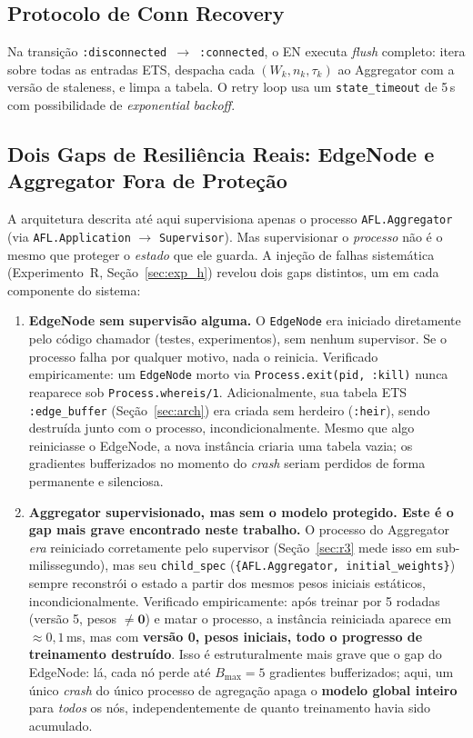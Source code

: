 \documentclass[conference,a4paper]{IEEEtran}
\begin{document}
\subsection{Protocolo de Conn Recovery}

Na transição \texttt{:disconnected}~$\rightarrow$~\texttt{:connected}, o EN
executa \textit{flush} completo: itera sobre todas as entradas ETS,
despacha cada $(W_k, n_k, \tau_k)$ ao Aggregator com a versão de staleness,
e limpa a tabela. O retry loop usa um \texttt{state\_timeout} de 5\,s com
possibilidade de \textit{exponential backoff}.

\subsection{Dois Gaps de Resiliência Reais: EdgeNode e Aggregator Fora de Proteção}
\label{sec:gap}

A arquitetura descrita até aqui supervisiona apenas o processo
\texttt{AFL.Aggregator} (via \texttt{AFL.Application} $\to$
\texttt{Supervisor}). Mas supervisionar o \emph{processo} não é o mesmo
que proteger o \emph{estado} que ele guarda. A injeção de falhas
sistemática (Experimento~R, Seção~\ref{sec:exp_h}) revelou dois gaps
distintos, um em cada componente do sistema:

\begin{enumerate}[leftmargin=*,noitemsep]
  \item \textbf{EdgeNode sem supervisão alguma.} O \texttt{EdgeNode} era
    iniciado diretamente pelo código chamador (testes, experimentos), sem
    nenhum supervisor. Se o processo falha por qualquer motivo, nada o
    reinicia. Verificado empiricamente: um \texttt{EdgeNode} morto via
    \texttt{Process.exit(pid, :kill)} nunca reaparece sob
    \texttt{Process.whereis/1}. Adicionalmente, sua tabela ETS
    \texttt{:edge\_buffer} (Seção~\ref{sec:arch}) era criada sem herdeiro
    (\texttt{:heir}), sendo destruída junto com o processo, incondicionalmente.
    Mesmo que algo reiniciasse o EdgeNode, a nova instância criaria uma
    tabela vazia; os gradientes bufferizados no momento do \textit{crash}
    seriam perdidos de forma permanente e silenciosa.
  \item \textbf{Aggregator supervisionado, mas sem o modelo protegido.
    Este é o gap mais grave encontrado neste trabalho.} O processo do Aggregator
    \emph{era} reiniciado corretamente pelo supervisor (Seção~\ref{sec:r3}
    mede isso em sub-milissegundo), mas seu \texttt{child\_spec}
    (\texttt{\{AFL.Aggregator, initial\_weights\}}) sempre reconstrói o
    estado a partir dos mesmos pesos iniciais estáticos, incondicionalmente.
    Verificado empiricamente: após treinar por 5 rodadas (versão 5, pesos
    $\neq \mathbf{0}$) e matar o processo, a instância reiniciada aparece
    em $\approx0{,}1$\,ms, mas com \textbf{versão 0, pesos iniciais,
    todo o progresso de treinamento destruído}. Isso é estruturalmente mais
    grave que o gap do EdgeNode: lá, cada nó perde até $B_{\max}=5$
    gradientes bufferizados; aqui, um único \textit{crash} do único
    processo de agregação apaga o \textbf{modelo global inteiro} para
    \emph{todos} os nós, independentemente de quanto treinamento havia
    sido acumulado.
\end{enumerate}
\end{document}
